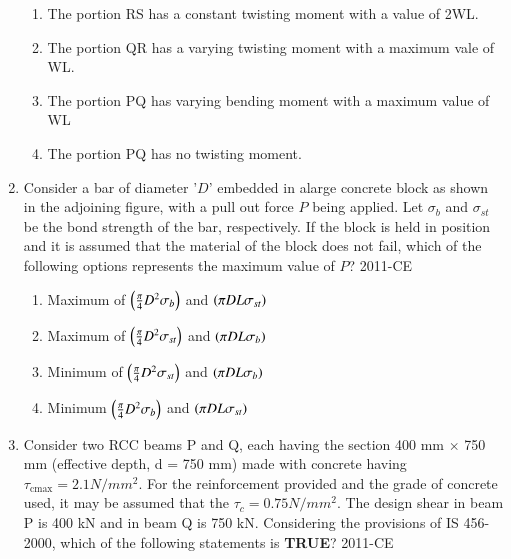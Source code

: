 \documentclass[journal,12pt,onecolumn]{IEEEtran}
\theoremstyle{remark}
\begin{document}
\begin{enumerate}
\begin{figure}[h!]
\centering

\end{figure}
	\begin{enumerate}
		\item The portion RS has a constant twisting moment with a value of 2WL.
		\item The portion QR has a varying twisting moment with a maximum vale of WL.
		\item The portion PQ has varying bending moment with a maximum value of WL
		\item The portion PQ has no twisting moment.
	\end{enumerate}

\newpage
\item Consider a bar of diameter '$D$' embedded in alarge concrete block as shown in the adjoining figure, with a pull out force $P$ being applied. Let $\sigma_b$ and $\sigma_{st}$ be the bond strength of the bar, respectively. If the block is held in position and it is assumed that the material of the block does not fail, which of the following options represents the maximum value of $P$?
	\hfill{2011-CE}

\begin{figure}[ht]
\centering

\end{figure}
	\begin{multicols}{2}
	\begin{enumerate}
		\item Maximum of $\left(\frac{\pi}{4}D^{2}\sigma_{b}\right)$ and $\left(\pi DL\sigma_{st}\right)$
		\item Maximum of $\left(\frac{\pi}{4}D^{2}\sigma_{st}\right)$ and $\left(\pi DL\sigma_{b}\right)$
		\item Minimum of $\left(\frac{\pi}{4}D^{2}\sigma_{st}\right)$ and $\left(\pi DL\sigma_{b}\right)$
		\item Minimum $\left(\frac{\pi}{4}D^{2}\sigma_{b}\right)$ and $\left(\pi DL\sigma_{st}\right)$
	\end{enumerate}
	\end{multicols}

\item Consider two RCC beams P and Q, each having the section 400 mm $\times$ 750 mm (effective depth, d = 750 mm) made with concrete having $\tau_{\text{cmax}} = 2.1 N/mm^{2}$. For the reinforcement provided and the grade of concrete used, it may be assumed that the $\tau_c = 0.75 N/mm^{2}$. The design shear in beam P is 400 kN and in beam Q is 750 kN. Considering the provisions of IS 456-2000, which of the following statements is \textbf{TRUE}?
	\hfill{2011-CE}


\end{enumerate}
\end{document}
